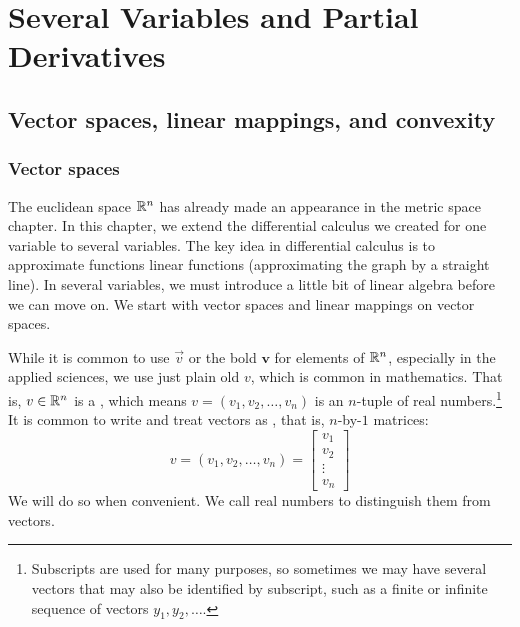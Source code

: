 \chapter{Several Variables and Partial Derivatives} \label{pd:chapter}


\section{Vector spaces, linear mappings, and convexity}
\label{sec:vectorspaces}


\subsection{Vector spaces}

The euclidean space ${\mathbb{R}}^n$ has already made an appearance in the metric
space chapter.  In this chapter, we extend the differential calculus
we created for one variable to several variables.  The key idea in
differential calculus is to approximate functions linear
functions (approximating the graph by a straight line).
In several variables, we must introduce a little bit of linear
algebra before we can move on.
We start with vector spaces and linear mappings on vector spaces.

While it is common to use $\vec{v}$ or the bold
$\mathbf{v}$ for elements of ${\mathbb{R}}^n$,
especially in the applied sciences,
we use just plain old $v$, which is common in mathematics.
That is, $v \in {\mathbb{R}}^n$ is a \emph{}, which means 
$v = (v_1,v_2,\ldots,v_n)$ is an $n$-tuple of
real numbers.\footnote{Subscripts are used for many purposes,
so sometimes we may have several vectors that may also
be identified by subscript, such as a finite or infinite sequence of
vectors $y_1,y_2,\ldots$.}
It is common to write and treat vectors as
\emph{}, that is, $n$-by-$1$ matrices:
\begin{equation*}
v =
(v_1,v_2,\ldots,v_n) =
{ \left[
\begin{smallmatrix}
v_1 \\ v_2 \\ \vdots \\ v_n
\end{smallmatrix}
\right]
}
\end{equation*}
We will do so when convenient.
We call real numbers
\emph{} to distinguish them from vectors.

